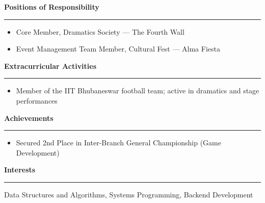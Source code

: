 \documentclass[a4paper,10pt]{article}
\begin{document}
\textbf{Positions of Responsibility} \\
\hrule
\vspace{3pt}
\begin{itemize}
    \item Core Member, Dramatics Society — The Fourth Wall
    \item Event Management Team Member, Cultural Fest — Alma Fiesta
\end{itemize}

\vspace{7pt}

\textbf{Extracurricular Activities} \\
\hrule
\vspace{3pt}
\begin{itemize}
    \item Member of the IIT Bhubaneswar football team; active in dramatics and stage performances
\end{itemize}

\vspace{7pt}

\textbf{Achievements} \\
\hrule
\vspace{3pt}
\begin{itemize}
    \item Secured 2nd Place in Inter-Branch General Championship (Game Development)
\end{itemize}

\vspace{7pt}

\textbf{Interests} \\
\hrule
\vspace{3pt}
Data Structures and Algorithms, Systems Programming, Backend Development
\end{document}

